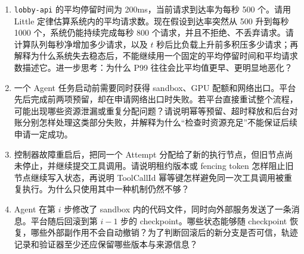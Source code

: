 \begin{tcolorbox}[breakable]
\begin{enumerate}
    \item \texttt{lobby-api} 的平均停留时间为 200ms，当前请求到达率为每秒 500 个。请用 Little 定律估算系统内的平均请求数。现在假设到达率突然从 500 升到每秒 1000 个，系统仍能持续完成每秒 800 个请求，并且不拒绝、不丢弃请求。请计算队列每秒净增加多少请求，以及 $t$ 秒后比负载上升前多积压多少请求；再解释为什么系统失去稳态后，不能继续用一个固定的平均停留时间和平均请求数描述它。进一步思考：为什么 P99 往往会比平均值更早、更明显地恶化？

    \item 一个 Agent 任务启动前需要同时获得 sandbox、GPU 配额和网络出口。平台先后完成前两项预留，却在申请网络出口时失败。若平台直接重试整个流程，可能出现哪些资源泄漏或重复分配问题？请说明幂等预留、超时释放和后台对账分别怎样处理这类部分失败，并解释为什么“检查时资源充足”不能保证后续申请一定成功。

    \item 控制器故障重启后，把同一个 Attempt 分配给了新的执行节点，但旧节点尚未停止，并继续提交工具调用。请说明租约版本或 fencing token 怎样阻止旧节点继续写入状态，再说明 ToolCallId 幂等键怎样避免同一次工具调用被重复执行。为什么只使用其中一种机制仍然不够？

    \item Agent 在第 $i$ 步修改了 sandbox 内的代码文件，同时向外部服务发送了一条消息。平台随后回滚到第 $i-1$ 步的 checkpoint。哪些状态能够随 checkpoint 恢复，哪些外部副作用不会自动撤销？为了判断回滚后的新分支是否可信，轨迹记录和验证器至少还应保留哪些版本与来源信息？
\end{enumerate}
\end{tcolorbox}

\newpage
